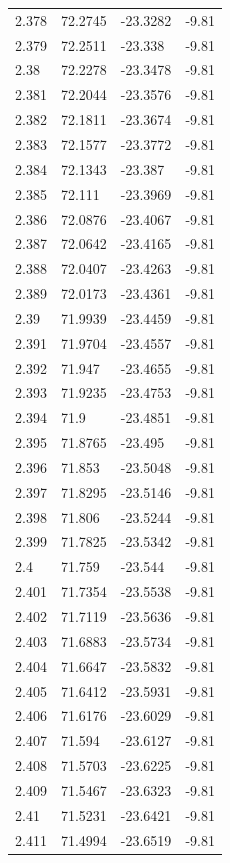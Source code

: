 \begin{tabular}{llll}
2.378 & 72.2745 & -23.3282 & -9.81 \\
2.379 & 72.2511 & -23.338 & -9.81 \\
2.38 & 72.2278 & -23.3478 & -9.81 \\
2.381 & 72.2044 & -23.3576 & -9.81 \\
2.382 & 72.1811 & -23.3674 & -9.81 \\
2.383 & 72.1577 & -23.3772 & -9.81 \\
2.384 & 72.1343 & -23.387 & -9.81 \\
2.385 & 72.111 & -23.3969 & -9.81 \\
2.386 & 72.0876 & -23.4067 & -9.81 \\
2.387 & 72.0642 & -23.4165 & -9.81 \\
2.388 & 72.0407 & -23.4263 & -9.81 \\
2.389 & 72.0173 & -23.4361 & -9.81 \\
2.39 & 71.9939 & -23.4459 & -9.81 \\
2.391 & 71.9704 & -23.4557 & -9.81 \\
2.392 & 71.947 & -23.4655 & -9.81 \\
2.393 & 71.9235 & -23.4753 & -9.81 \\
2.394 & 71.9 & -23.4851 & -9.81 \\
2.395 & 71.8765 & -23.495 & -9.81 \\
2.396 & 71.853 & -23.5048 & -9.81 \\
2.397 & 71.8295 & -23.5146 & -9.81 \\
2.398 & 71.806 & -23.5244 & -9.81 \\
2.399 & 71.7825 & -23.5342 & -9.81 \\
2.4 & 71.759 & -23.544 & -9.81 \\
2.401 & 71.7354 & -23.5538 & -9.81 \\
2.402 & 71.7119 & -23.5636 & -9.81 \\
2.403 & 71.6883 & -23.5734 & -9.81 \\
2.404 & 71.6647 & -23.5832 & -9.81 \\
2.405 & 71.6412 & -23.5931 & -9.81 \\
2.406 & 71.6176 & -23.6029 & -9.81 \\
2.407 & 71.594 & -23.6127 & -9.81 \\
2.408 & 71.5703 & -23.6225 & -9.81 \\
2.409 & 71.5467 & -23.6323 & -9.81 \\
2.41 & 71.5231 & -23.6421 & -9.81 \\
2.411 & 71.4994 & -23.6519 & -9.81 \\

\end{tabular}
